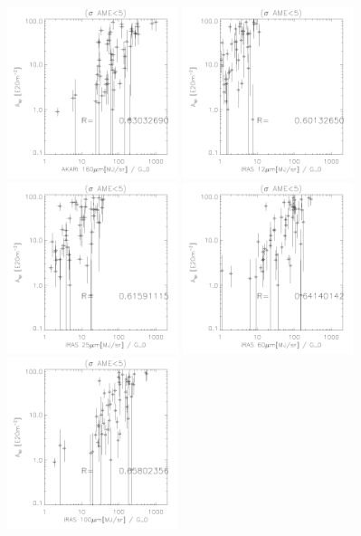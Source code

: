 \begin{figure}[!htb]
  \includegraphics[width=50mm]{IRIntG0MWAmp/akari160G0_Asp_nosp.pdf}
  \includegraphics[width=50mm]{IRIntG0MWAmp/iras12G0_Asp_nosp.pdf}
  \includegraphics[width=50mm]{IRIntG0MWAmp/iras25G0_Asp_nosp.pdf}
  \includegraphics[width=50mm]{IRIntG0MWAmp/iras60G0_Asp_nosp.pdf}
  \includegraphics[width=50mm]{IRIntG0MWAmp/iras100G0_Asp_nosp.pdf}

\end{figure}
